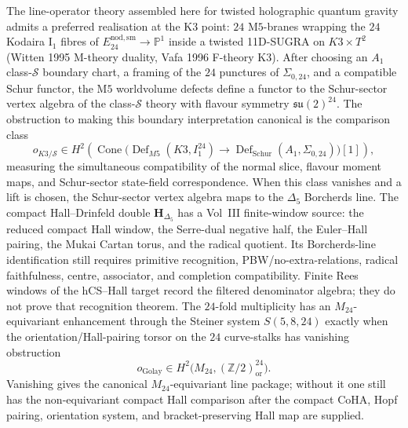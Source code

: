 \begin{remark}
\label{rem:line-operators-1}
The line-operator theory assembled here for twisted holographic quantum
gravity admits a preferred realisation at the K3 point:
$24$ M$5$-branes wrapping the $24$ Kodaira I$_1$ fibres of
$E^{\mathrm{nod,sm}}_{24}\to\mathbb P^1$ inside a twisted 11D-SUGRA on
$K3\times T^2$ (Witten 1995 M-theory duality, Vafa 1996 F-theory K3).
After choosing an $A_1$ class-$\mathcal S$ boundary chart, a framing of
the $24$ punctures of $\Sigma_{0,24}$, and a compatible Schur functor,
the M$5$ worldvolume defects define a functor to the Schur-sector
vertex algebra of the class-$\mathcal S$ theory with flavour symmetry
$\mathfrak{su}(2)^{24}$. The obstruction to making this boundary
interpretation canonical is the comparison class
\[
 o_{K3/\mathcal S}\in
 H^2\!\left(
 \operatorname{Cone}\bigl(
 \operatorname{Def}_{M5}(K3,I_1^{24})
 \longrightarrow
 \operatorname{Def}_{\mathrm{Schur}}(A_1,\Sigma_{0,24})
 \bigr)[1]\right),
\]
measuring the simultaneous compatibility of the normal slice, flavour
moment maps, and Schur-sector state-field correspondence. When this
class vanishes and a lift is chosen, the Schur-sector vertex algebra
maps to the $\Delta_5$ Borcherds line. The compact Hall--Drinfeld double
$\mathbf H_{\Delta_5}$ has a Vol~III finite-window source: the reduced
compact Hall window, the Serre-dual negative half, the Euler--Hall
pairing, the Mukai Cartan torus, and the radical quotient. Its
Borcherds-line identification still requires primitive recognition,
PBW/no-extra-relations, radical faithfulness, centre, associator, and
completion compatibility. Finite Rees windows of the hCS--Hall target
record the filtered denominator algebra; they do not prove that
recognition theorem. The $24$-fold
multiplicity has an $M_{24}$-equivariant enhancement through the
Steiner system $S(5,8,24)$ exactly when the orientation/Hall-pairing
torsor on the $24$ curve-stalks has vanishing obstruction
\[
 o_{\mathrm{Golay}}\in
 H^2\bigl(M_{24},(\mathbb Z/2)^{24}_{\mathrm{or}}\bigr).
\]
Vanishing gives the canonical $M_{24}$-equivariant line package;
without it one still has the non-equivariant compact Hall comparison
after the compact CoHA, Hopf pairing, orientation system, and
bracket-preserving Hall map are supplied.
\end{remark}


